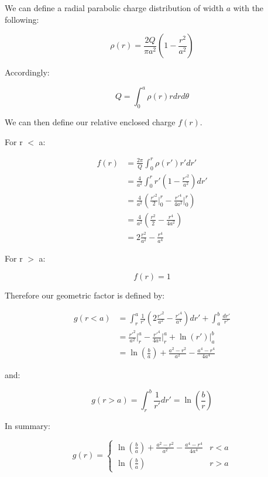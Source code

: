 We can define a radial parabolic charge distribution of width $a$ with the following:

$$\rho(r) = \frac{2Q}{\pi a^2}\left(1-\frac{r^2}{a^2}\right)$$

Accordingly:

$$Q = \int_0^a \rho(r) r dr d\theta$$

We can then define our relative enclosed charge $f(r)$.

For r $<$ a:

$$\begin{aligned}
        f(r) & = \frac{2\pi}{Q}\int_0^r\rho(r')r'dr'                                           \\
             & = \frac{4}{a^2}\int_0^rr'(1-\frac{r'^2}{a^2})dr'                                \\
             & = \frac{4}{a^2}\left(\frac{r'^2}{2}\Big|_0^r -\frac{r'^4}{4a^2}\Big|_0^r\right) \\
             & = \frac{4}{a^2}\left(\frac{r^2}{2}-\frac{r^4}{4a^2}\right)                      \\
             & = 2\frac{r^2}{a^2}-\frac{r^4}{a^4}
    \end{aligned}$$

For r $>$ a:

$$f(r) = 1$$

Therefore our geometric factor is defined by:

$$\begin{aligned}
        g(r<a) & = \int_r^a \frac{1}{r'}\left(2\frac{r'^2}{a^2}-\frac{r'^4}{a^4}\right)dr'+ \int_a^b\frac{dr'}{r'} \\
               & =\frac{r'^2}{a^2}\Big|_r^a-\frac{r'^4}{4a^4}\Big|_r^a + \ln\left(r'\right)\Big|_a^b               \\
               & = \ln\left(\frac{b}{a}\right) + \frac{a^2-r^2}{a^2} - \frac{a^4-r^4}{4a^4}
    \end{aligned}$$

and:

$$g(r>a) = \int_r^b\frac{1}{r'}dr' = \ln\left(\frac{b}{r}\right)$$

In summary:

\begin{equation}
    g(r) = \begin{cases}
        \ln\left(\frac{b}{a}\right)+\frac{a^2-r^2}{a^2}-\frac{a^4-r^4}{4a^4} & r < a \\
        \ln(\frac{b}{a})                                                     & r > a\end{cases}
    \label{eq:g_parabolic}
\end{equation}

